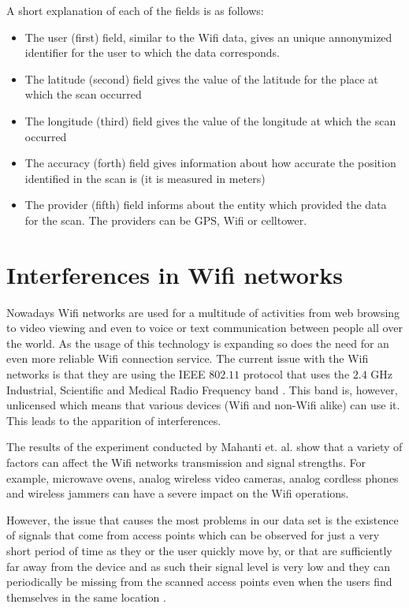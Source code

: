 A short explanation of each of the fields is as follows:
\begin{itemize}
  \item The user (first) field, similar to the Wifi data, gives an unique
  annonymized identifier for the user to which the data corresponds.
  \item The latitude (second) field gives the value of the latitude for the
  place at which the scan occurred
  \item The longitude (third) field gives the value of the longitude at which
  the scan occurred
  \item The accuracy (forth) field gives information about how accurate the
  position identified in the scan is (it is measured in meters)
  \item The provider (fifth) field informs about the entity which provided
  the data for the scan. The providers can be GPS, Wifi or celltower.
\end{itemize}

\section{Interferences in Wifi networks}

Nowadays Wifi networks are used for a multitude of activities from web browsing
to video viewing and even to voice or text communication between people all over
the world. As the usage of this technology is expanding so does the need for an
even more reliable Wifi connection service. The current issue with the Wifi
networks is that they are using the IEEE $802.11$ protocol \cite{WLP} that uses
the $2.4$ GHz Industrial, Scientific and Medical Radio Frequency band
\cite{Flickenger:2003:BWC:940809}. This band is, however, unlicensed which means
that various devices (Wifi and non-Wifi alike) can use it. This leads to the
apparition of interferences.

The results of the experiment conducted by Mahanti et. al. \cite{MahantiCWA10}
show that a variety of factors can affect the Wifi networks transmission and
signal strengths. For example, microwave ovens, analog wireless video cameras,
analog cordless phones and wireless jammers can have a severe impact on the Wifi
operations.

However, the issue that causes the most problems in our data set is the
existence of signals that come from access points which can be observed for just
a very short period of time as they or the user quickly move by, or that are
sufficiently far away from the device and as such their signal level is very low
and they can periodically be missing from the scanned access points even when
the users find themselves in the same location \cite{fu2008wireless}. 

